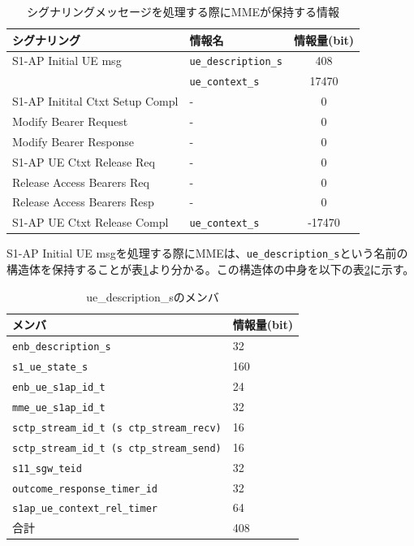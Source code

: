 \documentclass[a4j]{ujarticle}
\begin{document}
\begin{table}[htbp]
  \centering
  \caption{シグナリングメッセージを処理する際にMMEが保持する情報}
  \label{table:oai_source_memory}
  \begin{tabular}{l|l|c}
    \hline
    シグナリング  & 情報名 & 情報量(bit)  \\ \hline \hline
    S1-AP Initial UE msg & \verb|ue_description_s| & 408 \\
    & \verb|ue_context_s| & 17470\\\hline
    S1-AP Initital Ctxt Setup Compl & - & 0 \\\hline
    Modify Bearer Request & - & 0 \\\hline
    Modify Bearer Response & - & 0 \\\hline
    S1-AP UE Ctxt Release Req & - & 0 \\\hline
    Release Access Bearers Req & - & 0 \\\hline
    Release Access Bearers Resp & - & 0 \\\hline
    S1-AP UE Ctxt Release Compl & \verb|ue_context_s| & -17470 \\\hline

  \end{tabular}
\end{table}

S1-AP Initial UE msgを処理する際にMMEは、\verb|ue_description_s|という名前の構造体を保持することが表\ref{table:oai_source_memory}より分かる。この構造体の中身を以下の表\ref{table:oai_source_memory_ue_description_s}に示す。
\begin{table}[htbp]
  \centering
  \caption{ue\_description\_sのメンバ}
  \label{table:oai_source_memory_ue_description_s}
  \begin{tabular}{l|l}
    \hline
    メンバ & 情報量(bit) \\ \hline \hline
    \verb|enb_description_s| & 32\\
    \verb|s1_ue_state_s| & 160\\
    \verb|enb_ue_s1ap_id_t|  & 24\\
    \verb|mme_ue_s1ap_id_t| & 32\\
    \verb|sctp_stream_id_t (s ctp_stream_recv)| & 16\\
    \verb|sctp_stream_id_t (s ctp_stream_send)| & 16\\
    \verb|s11_sgw_teid| & 32\\
    \verb|outcome_response_timer_id| & 32\\
    \verb|s1ap_ue_context_rel_timer| & 64\\\hline
    合計  & 408\\\hline
  \end{tabular}
\end{table}
\end{document}
